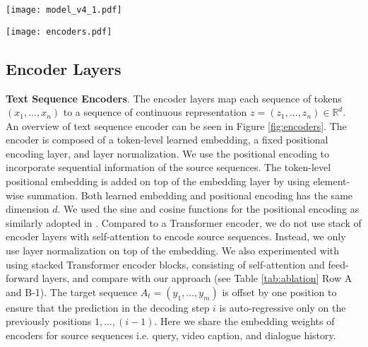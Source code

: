 \documentclass[11pt,a4paper]{article}
\begin{document}
\begin{figure*}[htbp]
	\centering
	\texttt{[image: model\_v4\_1.pdf]}
	\caption{Our MTN architecture includes 3 major components: (i) encoder layers encode text sequences and video features; (ii) decoder layers (D) project target sequence and attend on multiple inputs; and (iii) Query-Aware Auto-Encoder layers (QAE) attend on non-text modalities from query features. For simplicity, Feed Forward, Residual Connection and Layer Normalization layers are not presented. Best viewed in color.}
	\label{fig:model}
\end{figure*}

\begin{figure*}[!htb]
	\centering
	\texttt{[image: encoders.pdf]}
	\caption{2 types of encoders are used: text-sequence encoders (left) and video encoders (right). Text-sequence encoders are used on text input, i.e. dialogue history, video caption, query, and output sequence. Video encoders are used on visual and audio features of input video.}
	\label{fig:encoders}
\end{figure*}

\subsection{Encoder Layers}
\textbf{Text Sequence Encoders}. The encoder layers map each sequence of tokens $(x_1,...,x_n)$ to a sequence of continuous representation $z=(z_1,...,z_n) \in \mathbb{R}^d$. An overview of text sequence encoder can be seen in Figure \ref{fig:encoders}. The encoder is composed of a token-level learned embedding, a fixed positional encoding layer, and layer normalization. We use the positional encoding to incorporate sequential information of the source sequences.  The token-level positional embedding is added on top of the embedding layer by using element-wise summation. Both learned embedding and positional encoding has the same dimension $d$. We used the sine and cosine functions for the positional encoding as similarly adopted in \cite{vaswani17attention}. Compared to a Transformer encoder, we do not use stack of encoder layers with self-attention to encode source sequences. Instead, we only use layer normalization \cite{ba2016layer} on top of the embedding. We also experimented with using stacked Transformer encoder blocks, consisting of self-attention and feed-forward layers, and compare with our approach (see Table \ref{tab:ablation} Row A and B-1). The target sequence $A_t=(y_1,...,y_m)$ is offset by one position to ensure that the prediction in the decoding step $i$ is auto-regressive only on the previously positions $1,...,(i-1)$. Here we share the embedding weights of encoders for source sequences i.e. query, video caption, and dialogue history. 
\end{document}
